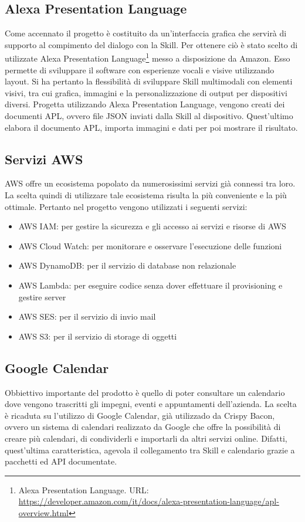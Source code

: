 \subsection{Alexa Presentation Language}
Come accennato il progetto è costituito da un'interfaccia grafica che servirà di supporto al compimento del dialogo con la Skill. Per ottenere ciò è stato scelto di utilizzate Alexa Presentation Language\footnote{Alexa Presentation Language. URL: \href{https://developer.amazon.com/it/docs/alexa-presentation-language/apl-overview.html}{https://developer.amazon.com/it/docs/alexa-presentation-language/apl-overview.html}} messo a disposizione da Amazon. Esso permette di sviluppare il software con esperienze vocali e visive utilizzando layout. Si ha pertanto la flessibilità di sviluppare Skill multimodali con elementi visivi, tra cui grafica, immagini e la personalizzazione di output per dispositivi diversi. Progetta utilizzando Alexa Presentation Language, vengono creati dei documenti APL, ovvero file JSON inviati dalla Skill al dispositivo. Quest'ultimo elabora il documento APL, importa immagini e dati per poi mostrare il risultato.

\subsection{Servizi AWS}
AWS offre un ecosistema popolato da numerosissimi servizi già connessi tra loro. La scelta quindi di utilizzare tale ecosistema risulta la più conveniente e la più ottimale. Pertanto nel progetto vengono utilizzati i seguenti servizi:
\begin{itemize}
    \item AWS IAM: per gestire la sicurezza e gli accesso ai servizi e risorse di AWS
    \item AWS Cloud Watch: per monitorare e osservare l'esecuzione delle funzioni
    \item AWS DynamoDB: per il servizio di database non relazionale 
    \item AWS Lambda: per eseguire codice senza dover effettuare il provisioning e gestire server
    \item AWS SES: per il servizio di invio mail 
    \item AWS S3: per il servizio di storage di oggetti 
\end{itemize}

\subsection{Google Calendar}
Obbiettivo importante del prodotto è quello di poter consultare un calendario dove vengono trascritti gli impegni, eventi e appuntamenti dell'azienda. La scelta è ricaduta su l'utilizzo di Google Calendar, già utilizzado da Crispy Bacon, ovvero un sistema di calendari realizzato da Google che offre la possibilità di creare più calendari, di condividerli e importarli da altri servizi online. Difatti, quest'ultima caratteristica, agevola il collegamento tra Skill e calendario grazie a pacchetti ed API documentate.

